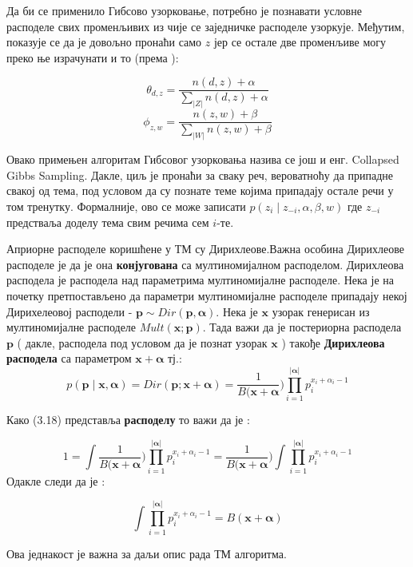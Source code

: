 Да би се применило Гибсово узорковање, потребно је познавати  условне расподеле свих променљивих из чије се заједничке расподеле узоркује. Међутим, показује се да је довољно пронаћи само $z$ јер се остале две променљиве могу преко ње израчунати и то (према \cite{verov9}):

$$
\theta_{d,z} = \frac{n(d,z)+\alpha}{\sum_{|Z|}n(d,z)+\alpha}
$$
$$
\phi_{z,w} = \frac{n(z,w)+\beta}{\sum_{|W|}n(z,w)+\beta}
$$
 
Овако примењен алгоритам Гибсовог узорковања назива се још и енг. Collapsed Gibbs Sampling. Дакле, циљ је пронаћи за сваку реч, вероватноћу да припадне свакој од тема, под условом да су познате теме којима припадају остале речи у том тренутку. Формалније, ово се може записати $ p(z_i \mid z_{-i},\alpha,\beta,w)$ где $ z_{-i}$ предстваља доделу тема свим речима сем $i$-те. 

Априорне расподеле коришћене у ТМ су Дирихлеове.Важна особина Дирихлеове расподеле је да је она \textbf{конјугована} са мултиномијалном расподелом. 
Дирихлеова расподела је расподела над параметрима мултиномијалне расподеле. Нека је на почетку претпостављено да параметри мултиномијалне расподеле припадају некој Дирихелеовој расподели - $\mathbf{p} \sim Dir(\mathbf{p,\alpha})$. Нека је $\mathbf{x}$ узорак генерисан из мултиномијалне расподеле $Mult(\mathbf{x;p})$. Тада важи да је постериорна расподела $\mathbf{p}$ ( дакле, расподела под условом да је познат узорак  $\mathbf{x}$ ) такође \textbf{Дирихлеова расподела} са параметром $\mathbf{x+\alpha}$ тј.:
\begin{equation}
p(\mathbf{p\mid x,\alpha}) = Dir(\mathbf{p;x+\alpha}) = \frac{1}{B(\mathbf{x+\alpha}})\prod_{i=1}^{|\mathbf{\alpha}|} p_i^{x_i+\alpha_i-1}
\end{equation}

Како (3.18) представља \textbf{расподелу} то важи да је :

\begin{equation}
1 = \int \frac{1}{B(\mathbf{x+\alpha}})\prod_{i=1}^{|\mathbf{\alpha}|} p_i^{x_i+\alpha_i-1} = \frac{1}{B(\mathbf{x+\alpha}})\int \prod_{i=1}^{|\mathbf{\alpha}|} p_i^{x_i+\alpha_i-1}
\end{equation}
Одакле следи да је :

\begin{equation}
\int \prod_{i=1}^{|\mathbf{\alpha}|} p_i^{x_i+\alpha_i-1} = B(\mathbf{x+\alpha})
\end{equation}

Ова једнакост је важна за даљи опис рада ТМ алгоритма.

